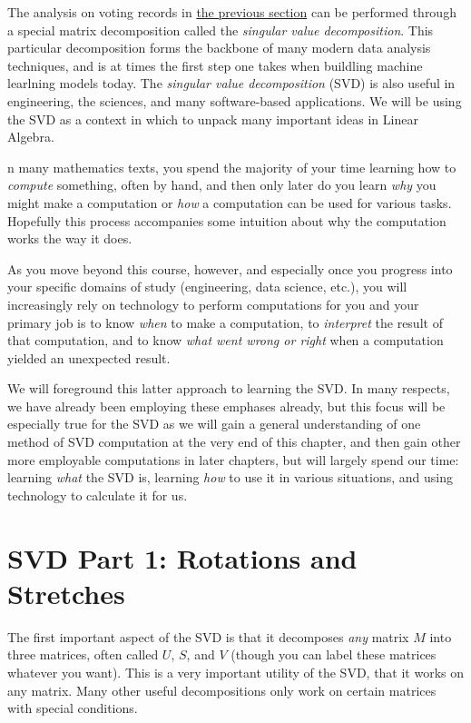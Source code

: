 \documentclass{ximera}
\begin{document}
The analysis on voting records in \href{https://ximera.osu.edu/appliedlinearalgebra/c6ChapterSix/learningActivities/m6LearningActivities/leastSquares/leastSquaresApplicationVotingImages}{the previous section} can be performed through a special matrix decomposition called the \emph{singular value decomposition}. This particular decomposition forms the backbone of many modern data analysis techniques, and is at times the first step one takes when buildling machine learlning models today. The \emph{singular value decomposition} (SVD) is also useful in engineering, the sciences, and many software-based applications. We will be using the SVD as a context in which to unpack many important ideas in Linear Algebra.

n many mathematics texts, you spend the majority of your time learning how to \emph{compute} something, often by hand, and then only later do you learn \emph{why} you might make a computation or \emph{how} a computation can be used for various tasks. Hopefully this process accompanies some intuition about why the computation works the way it does. 

As you move beyond this course, however, and especially once you progress into your specific domains of study (engineering, data science, etc.), you will increasingly rely on technology to perform computations for you and your primary job is to know \emph{when} to make a computation, to \emph{interpret} the result of that computation, and to know \emph{what went wrong or right} when a computation yielded an unexpected result. 

We will foreground this latter approach to learning the SVD. In many respects, we have already been employing these emphases already, but this focus will be especially true for the SVD as we will gain a general understanding of one method of SVD computation at the very end of this chapter, and then gain other more employable computations in later chapters, but will largely spend our time: learning \emph{what} the SVD is, learning \emph{how} to use it in various situations, and using technology to calculate it for us.

\section{SVD Part 1: Rotations and Stretches}

The first important aspect of the SVD is that it decomposes \emph{any} matrix $M$ into three matrices, often called $U$, $S$, and $V$ (though you can label these matrices whatever you want). This is a very important utility of the SVD, that it works on any matrix. Many other useful decompositions only work on certain matrices with special conditions.
\end{document}
